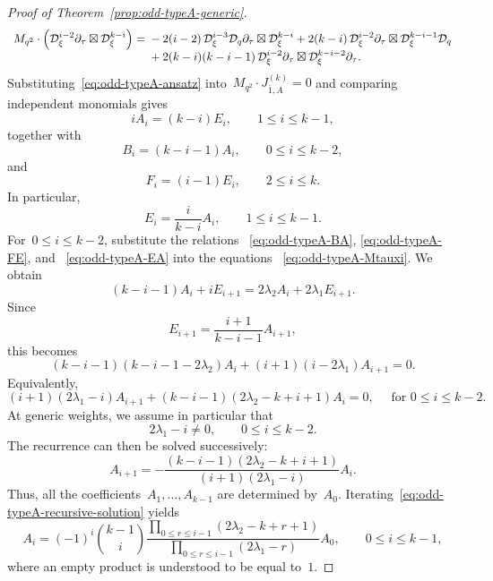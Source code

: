 \documentclass[12pt,a4paper]{amsart}
\theoremstyle{thm}
\theoremstyle{definition}
\newcommand {\Dq}{\cD_q}
\newcommand {\Dxi}{\cD_\xi}
\begin{document}
\begin{proof}[Proof of Theorem~\textup{\ref{prop:odd-typeA-generic}}]
\[
\begin{array}{r@{}l}
M_{q^2}\cdot
\left(
\Dxi^{i-2}\partial_\tau\boxtimes \Dxi^{k-i}
\right)
={}&
{}-2(i-2)\,
\Dxi^{i-3}\Dq\partial_\tau\boxtimes \Dxi^{k-i}
+
2(k-i)\,
\Dxi^{i-2}\partial_\tau\boxtimes \Dxi^{k-i-1}\Dq
\\
&{}+
2(k-i)(k-i-1)\,
\Dxi^{i-2}\partial_\tau\boxtimes \Dxi^{k-i-2}\partial_\tau .
\end{array}
\]
Substituting~\eqref{eq:odd-typeA-ansatz} into~$
M_{q^2}\cdot J_{\bar1,A}^{(k)}=0
$
and comparing independent monomials gives
\begin{equation*}
iA_i=(k-i)E_i,
\qquad
1\leq i\leq k-1,
\label{eq:odd-typeA-AE}
\end{equation*}
together with
\begin{equation}
B_i=(k-i-1)A_i,
\qquad
0\leq i\leq k-2,
\label{eq:odd-typeA-BA}
\end{equation}
and
\begin{equation}
F_i=(i-1)E_i,
\qquad
2\leq i\leq k.
\label{eq:odd-typeA-FE}
\end{equation}
In particular,
\begin{equation}
E_i=\frac{i}{k-i}A_i,
\qquad
1\leq i\leq k-1.
\label{eq:odd-typeA-EA}
\end{equation}
For~\(0\leq i\leq k-2\), substitute the relations~%
\eqref{eq:odd-typeA-BA},
\eqref{eq:odd-typeA-FE}, and~%
\eqref{eq:odd-typeA-EA} into the equations~%
\eqref{eq:odd-typeA-Mtauxi}. We obtain
\[
(k-i-1)A_i+iE_{i+1}
=
2\lambda_2A_i+2\lambda_1E_{i+1}.
\]
Since
\[
E_{i+1}
=
\frac{i+1}{k-i-1}A_{i+1},
\]
this becomes
\[
(k-i-1)(k-i-1-2\lambda_2)A_i
+
(i+1)(i-2\lambda_1)A_{i+1}
=
0.
\]
Equivalently,
\begin{equation*}
(i+1)(2\lambda_1-i)A_{i+1}
+
(k-i-1)(2\lambda_2-k+i+1)A_i
=
0, \quad \text{ for }
0\leq i\leq k-2.
\end{equation*}
At generic weights, we assume in particular that
\[
2\lambda_1-i\neq0,
\qquad
0\leq i\leq k-2.
\]
The recurrence can then be solved successively:
\begin{equation}
A_{i+1}
=
-
\frac{
(k-i-1)(2\lambda_2-k+i+1)
}{
(i+1)(2\lambda_1-i)
}
A_i.
\label{eq:odd-typeA-recursive-solution}
\end{equation}
Thus, all the coefficients~\(A_1,\ldots,A_{k-1}\) are determined by~\(A_0\). Iterating~\eqref{eq:odd-typeA-recursive-solution} yields
\begin{equation*}
A_i
=
(-1)^i
\binom{k-1}{i}
\frac{
\displaystyle
\prod_{0\leq r\leq i-1}
(2\lambda_2-k+r+1)
}{
\displaystyle
\prod_{0\leq r\leq i-1}
(2\lambda_1-r)
}
A_0,
\qquad
0\leq i\leq k-1,
\end{equation*}
where an empty product is understood to be equal to~\(1\).


\end{proof}
\end{document}
